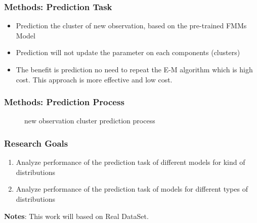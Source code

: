 \documentclass[xcolor=svgnames]{beamer}
\begin{document}

\begin{frame}\frametitle{Methods: Prediction Task}

  \begin{itemize}
    \item Prediction the cluster of new observation, based on the pre-trained FMMs Model
    \item Prediction will not update the parameter on each components (clusters)
    \item The benefit is prediction no need to repeat the E-M algorithm which is high cost. This approach is more effective and low cost. 
    
  \end{itemize}

\end{frame}


\begin{frame}\frametitle{Methods: Prediction Process}

  \begin{figure}
    \centering
    \caption{new observation cluster prediction process}
  \end{figure}

\end{frame}


\begin{frame}\frametitle{Research Goals}

  \begin{enumerate}
    \item Analyze performance of the prediction task of different models for kind of distributions
    \item Analyze performance of the prediction task of models for different types of distributions
  \end{enumerate}

  \vspace{1em}
  \hspace{1em}\textbf{Notes}: This work will based on Real DataSet.


\end{frame}
\end{document}
